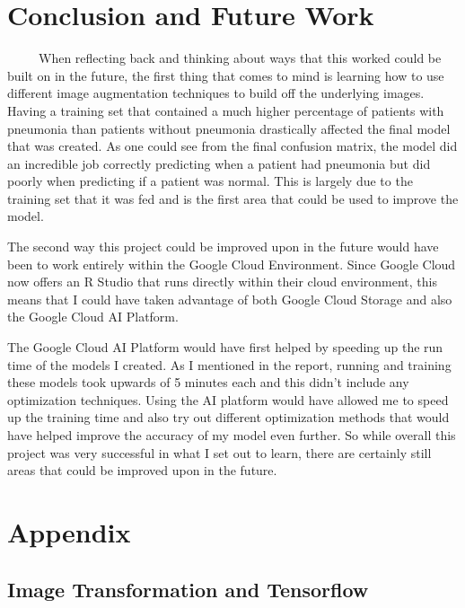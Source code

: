 \documentclass[12pt]{article}
\begin{document}
\hypertarget{conclusion-and-future-work}{%
\section{Conclusion and Future Work}\label{conclusion-and-future-work}}

~~~~~When reflecting back and thinking about ways that this worked could
be built on in the future, the first thing that comes to mind is
learning how to use different image augmentation techniques to build off
the underlying images. Having a training set that contained a much
higher percentage of patients with pneumonia than patients without
pneumonia drastically affected the final model that was created. As one
could see from the final confusion matrix, the model did an incredible
job correctly predicting when a patient had pneumonia but did poorly
when predicting if a patient was normal. This is largely due to the
training set that it was fed and is the first area that could be used to
improve the model.

The second way this project could be improved upon in the future would
have been to work entirely within the Google Cloud Environment. Since
Google Cloud now offers an R Studio that runs directly within their
cloud environment, this means that I could have taken advantage of both
Google Cloud Storage and also the Google Cloud AI Platform.

The Google Cloud AI Platform would have first helped by speeding up the
run time of the models I created. As I mentioned in the report, running
and training these models took upwards of 5 minutes each and this didn't
include any optimization techniques. Using the AI platform would have
allowed me to speed up the training time and also try out different
optimization methods that would have helped improve the accuracy of my
model even further. So while overall this project was very successful in
what I set out to learn, there are certainly still areas that could be
improved upon in the future.

\hypertarget{appendix}{%
\section{Appendix}\label{appendix}}

\hypertarget{image-transformation-and-tensorflow-1}{%
\subsection{Image Transformation and
Tensorflow}\label{image-transformation-and-tensorflow-1}}
\end{document}
